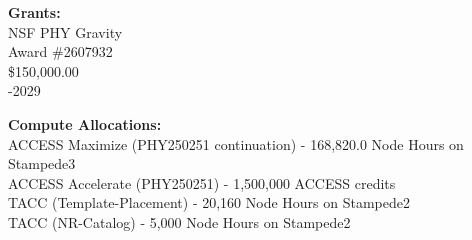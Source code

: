\documentclass[11pt]{article}
\begin{document}
\begin{flushleft}
  \textbf{Grants:}\\
  NSF PHY Gravity\\
  \quad Award \#2607932\\
  \quad \$150,000.00\\
  -2029\\

  \vspace{8px}	 
	 
  \textbf{Compute Allocations:}\\
  	ACCESS Maximize (PHY250251 continuation) - 168,820.0 Node Hours on Stampede3 \\
  	ACCESS Accelerate (PHY250251) - 1,500,000 ACCESS credits \\
  	TACC (Template-Placement) - 20,160 Node Hours on Stampede2 \\
	TACC (NR-Catalog) - 5,000 Node Hours on Stampede2 \\
	
  \vspace{8px}


\end{flushleft}
\end{document}
